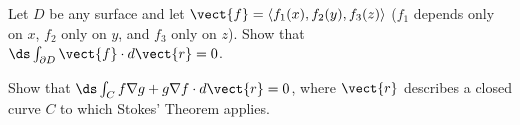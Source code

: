 \begin{enumialphparenastyle}
\begin{ex}
Let $D$ be any surface and 
let $\vect{f}=\langle f_1(x),f_2(y),f_3(z)\rangle$ ($f_1$ depends only on $x$,
$f_2$ only on $y$, and $f_3$ only on $z$). Show that
$\ds\int_{\partial D} \vect{f}\cdot d\vect{r}=0$.
\end{ex}

\begin{ex}
Show that $\ds\int_C f\nabla g+g\nabla f\cdot d\vect{r}=0$, where
$\vect{r}$ describes a closed curve $C$ to which Stokes' Theorem
applies.
\end{ex}

\end{enumialphparenastyle}
